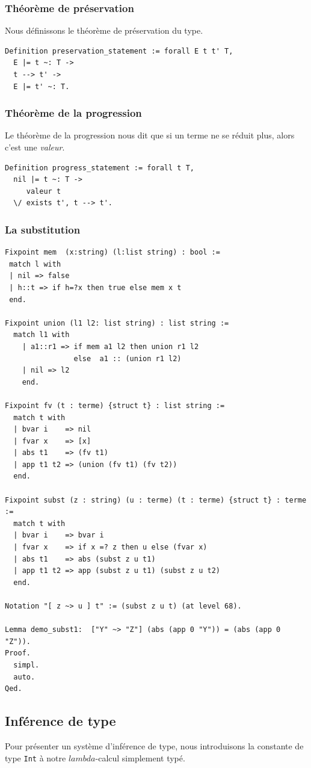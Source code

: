\documentclass[11pt]{book}
\begin{document}
\subsubsection{Théorème de préservation}
Nous définissons le théorème de préservation du type.
\begin{Verbatim}
Definition preservation_statement := forall E t t' T,
  E |= t ~: T ->
  t --> t' ->
  E |= t' ~: T.
\end{Verbatim}

\subsubsection{Théorème de la progression}
Le théorème de la progression nous dit que si un terme ne se réduit plus, alors c'est une \textit{valeur}.
\begin{Verbatim}
Definition progress_statement := forall t T, 
  nil |= t ~: T ->
     valeur t 
  \/ exists t', t --> t'.
\end{Verbatim}


\subsubsection{La substitution}
\begin{Verbatim}
Fixpoint mem  (x:string) (l:list string) : bool :=
 match l with
 | nil => false
 | h::t => if h=?x then true else mem x t 
 end.

Fixpoint union (l1 l2: list string) : list string :=
  match l1 with
    | a1::r1 => if mem a1 l2 then union r1 l2
                else  a1 :: (union r1 l2)
    | nil => l2
    end.

Fixpoint fv (t : terme) {struct t} : list string :=
  match t with
  | bvar i    => nil
  | fvar x    => [x]
  | abs t1    => (fv t1)
  | app t1 t2 => (union (fv t1) (fv t2))
  end.

Fixpoint subst (z : string) (u : terme) (t : terme) {struct t} : terme :=
  match t with
  | bvar i    => bvar i
  | fvar x    => if x =? z then u else (fvar x)
  | abs t1    => abs (subst z u t1)
  | app t1 t2 => app (subst z u t1) (subst z u t2)
  end.

Notation "[ z ~> u ] t" := (subst z u t) (at level 68).

Lemma demo_subst1:  ["Y" ~> "Z"] (abs (app 0 "Y")) = (abs (app 0 "Z")).
Proof.
  simpl.
  auto.
Qed.
\end{Verbatim}

\subsection{Inférence de type}
Pour présenter un système d'inférence de type, nous introduisons la constante de type \verb+Int+ à notre $lambda$-calcul
simplement typé.
\end{document}

